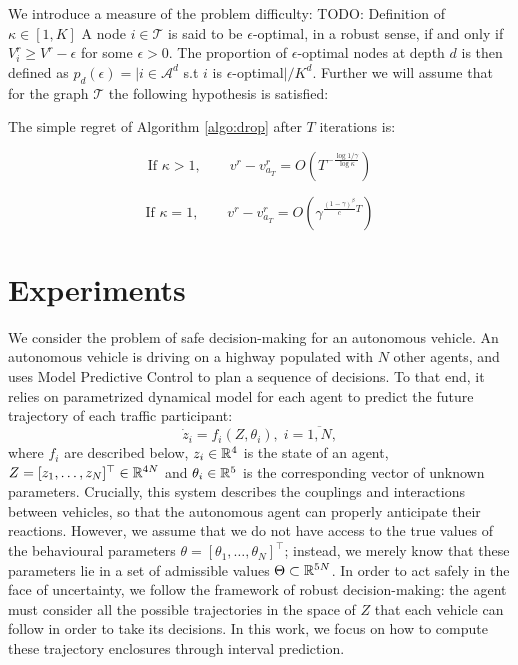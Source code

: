 \documentclass{article}
\begin{document}
We introduce a measure of the problem difficulty: TODO: Definition of $\kappa\in [1, K]$
A node $i\in\mathcal{T}$ is said to be $\epsilon$-optimal, in a robust sense, if and only if $V_i^r \geq V^r - \epsilon$ for some $\epsilon > 0$. The proportion of $\epsilon$-optimal nodes at depth $d$ is then defined as $p_d(\epsilon) = |i \in \mathcal{A}^d$ s.t $i$ is $\epsilon$-optimal$|/K^d$. Further we will assume that for the graph $\mathcal{T}$ the following hypothesis is satisfied:

\begin{theorem}
\label{theorem:drop-regret}
The simple regret of Algorithm \ref{algo:drop} after $T$ iterations is:

\begin{equation}
\text{If } \kappa>1,\qquad 
v^r - v^r_{a_T} = O\left(T^{-\frac{\log 1/\gamma}{\log \kappa}}\right)
\end{equation}

\begin{equation}
\text{If }\kappa=1,\qquad
v^r - v^r_{a_T} = O\left(\gamma^{\frac{(1-\gamma)^\beta}{c}T}\right)
\end{equation}
\end{theorem}

\section{Experiments}

We consider the problem of safe decision-making for an autonomous vehicle. An autonomous vehicle is driving on a highway populated with $N$ other agents, and uses Model Predictive Control to plan a sequence of decisions. To that end, it relies on parametrized dynamical model for each agent to predict the future trajectory of each traffic participant: \[\dot{z}_i=f_i(Z,\theta_i),\;i=\overline{1,N},\] where $f_i$ are described below, $z_i\in\mathbb{R}^4$ is the state of an agent, $Z = [z_1,\dots,z_N]^\top\in\mathbb{R}^{4N}$ and $\theta_i\in\mathbb{R}^5$ is the corresponding vector of unknown parameters. Crucially, this system describes the couplings and interactions between vehicles, so that the autonomous agent can properly anticipate their reactions. 
However, we assume that we do not have access to the true values of the behavioural parameters $\theta=[\theta_1,\dots,\theta_N]^\top$; instead, we merely know that these parameters lie in a set of admissible values $\Theta\subset\mathbb{R}^{5N}$. In order to act safely in the face of uncertainty, we follow the framework of robust decision-making: the agent must consider all the possible trajectories in the space of $Z$ that each vehicle can follow in order to take its decisions. In this work, we focus on how to compute these trajectory enclosures through interval prediction.
\end{document}
